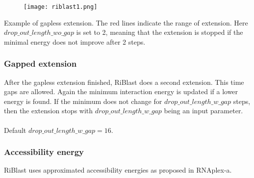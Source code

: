 \begin{figure}[H]
	\centering
	\texttt{[image: riblast1.png]}
\end{figure}

Example of gapless extension. The red lines indicate the range of extension. Here $drop\_out\_length\_wo\_gap$ is set to 2, meaning that the extension is stopped if the minimal energy does not improve after 2 steps.

\subsubsection{Gapped extension}

After the gapless extension finished, RiBlast does a second extension. This time gaps are allowed. Again the minimum interaction energy is updated if a lower energy is found. If the minimum does not change for $drop\_out\_length\_w\_gap$ steps, then the extension stops with $drop\_out\_length\_w\_gap$ being an input parameter.
\\\\
Default $drop\_out\_length\_w\_gap = 16$.

\subsubsection{Accessibility energy}

RiBlast uses approximated accessibility energies as proposed in RNAplex-a.